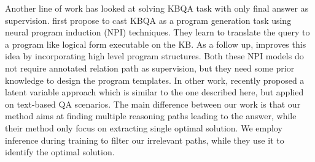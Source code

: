 
Another line of work has looked at solving KBQA task with only final answer as supervision.  first propose to cast KBQA as a program generation task using neural program induction (NPI) techniques. They learn to translate the query to a program like logical form executable on the KB. As a follow up,  improves this idea by incorporating high level program structures. Both these NPI models do not require annotated relation path as supervision, but they need some prior knowledge to design the program templates. In other work,  recently proposed a latent variable approach which is similar to the one described here, but applied on text-based QA scenarios. The main difference between our work is that our method aims at finding multiple reasoning paths leading to the answer, while their method only focus on extracting single optimal solution. We employ inference during training to filter our irrelevant paths, while they use it to identify the optimal solution.